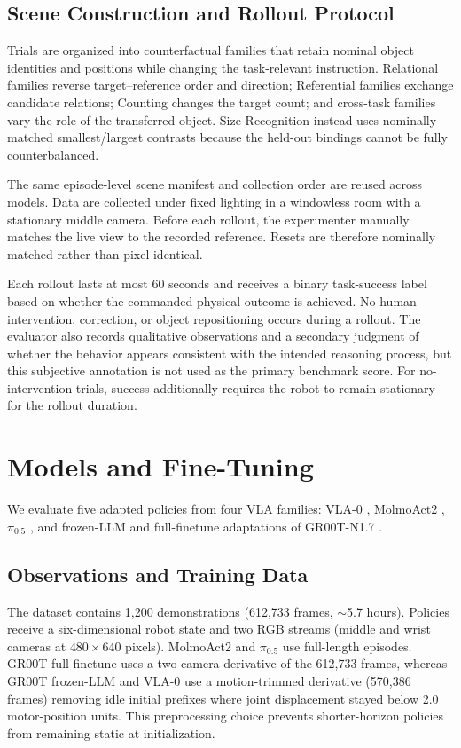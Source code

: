 \documentclass[conference]{IEEEtran}
\begin{document}
\subsection{Scene Construction and Rollout Protocol}

Trials are organized into counterfactual families that retain nominal object
identities and positions while changing the task-relevant instruction.
Relational families reverse target--reference order and direction;
Referential families exchange candidate relations; Counting changes the
target count; and cross-task families vary the role of the transferred
object. Size Recognition instead uses nominally matched smallest/largest
contrasts because the held-out bindings cannot be fully counterbalanced.

The same episode-level scene manifest and collection order are reused across
models. Data are collected under fixed lighting in a windowless room with a
stationary middle camera. Before each rollout, the experimenter manually
matches the live view to the recorded reference. Resets are therefore
nominally matched rather than pixel-identical.

Each rollout lasts at most 60 seconds and receives a binary task-success label based on whether the commanded physical outcome is achieved. No human intervention, correction, or object repositioning occurs during a rollout. The evaluator also records qualitative observations and a secondary judgment of whether the behavior appears consistent with the intended reasoning process, but this subjective annotation is not used as the primary benchmark score. For no-intervention trials, success additionally requires the robot to remain stationary for the rollout duration.

\section{Models and Fine-Tuning}

We evaluate five adapted policies from four VLA families: VLA-0
\cite{goyal2025vla0}, MolmoAct2 \cite{fang2026molmoact2}, $\pi_{0.5}$
\cite{black2025pi05}, and frozen-LLM and full-finetune adaptations of
GR00T-N1.7 \cite{nvidia2025grootn1}.

\subsection{Observations and Training Data}

The dataset contains 1,200 demonstrations (612,733 frames, $\sim$5.7 hours). Policies receive a six-dimensional robot state and two RGB streams (middle and wrist cameras at $480\times640$ pixels). MolmoAct2 and $\pi_{0.5}$ use full-length episodes. GR00T full-finetune uses a two-camera derivative of the 612,733 frames, whereas GR00T frozen-LLM and VLA-0 use a motion-trimmed derivative (570,386 frames) removing idle initial prefixes where joint displacement stayed below 2.0 motor-position units. This preprocessing choice prevents shorter-horizon policies from remaining static at initialization.
\end{document}
